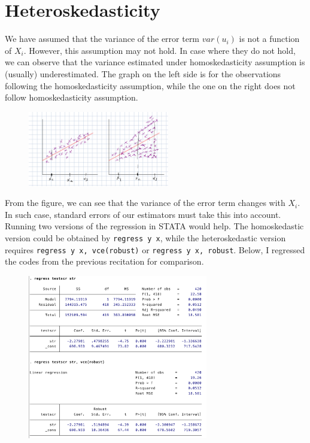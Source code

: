 \section{Heteroskedasticity}
We have assumed that the variance of the error term $var(u_i)$ is not a function of $X_i$. However, this assumption may not hold. In case where they do not hold, we can observe that the variance estimated under homoskedasticity assumption is (usually) underestimated. The graph on the left side is for the observations following the homoskedasticity assumption, while the one on the right does not follow homoskedasticity assumption.
\begin{figure}[H]
\centering
\includegraphics[width=0.55\textwidth]{hetero.png}
\end{figure}
\par\medskip
From the figure, we can see that the variance of the error term changes with $X_i$. In such case, standard errors of our estimators must take this into account. Running two versions of the regression in STATA would help. The homoskedastic version could be obtained by \texttt{regress y x}, while the heteroskedastic version requires \texttt{regress y x, vce(robust)} or \texttt{regress y x, robust}.  Below, I regressed the codes from the previous recitation for comparison. \par\medskip
\begin{figure}[H]
\centering
\includegraphics[width=0.7\textwidth]{heterovhomo.png}
\end{figure}

